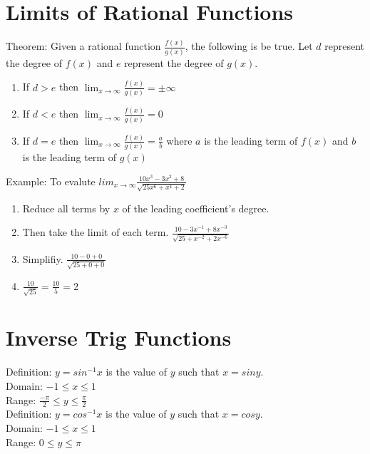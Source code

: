 \documentclass{article}
\begin{document}
\section{Limits of Rational Functions}
Theorem: Given a rational function $\frac{f(x)}{g(x)}$, the following is be true.
Let $d$ represent the degree of $f(x)$ and $e$ represent the degree of $g(x)$.\\
\begin{enumerate}
  \item If $d > e$ then $\lim_{x \to \infty}\frac{f(x)}{g(x)} = \pm \infty$
  \item If $d < e$ then $\lim_{x \to \infty}\frac{f(x)}{g(x)} = 0$
  \item If $d = e$ then $\lim_{x \to \infty}\frac{f(x)}{g(x)} = \frac{a}{b}$ where $a$ is the leading term of $f(x)$ and $b$ is the leading term of $g(x)$
\end{enumerate}

Example: To evalute $lim_{x \to \infty}\frac{10x^3 - 3x^2 + 8}{\sqrt{25x^6 + x^4 + 2}}$
\begin{enumerate}
  \item {Reduce all terms by $x$ of the leading coefficient's degree.}
  \item {Then take the limit of each term. $\frac{10 - 3x^{-1} + 8x^{-3}}{\sqrt{25 + x^{-2} + 2x^{-6}}}$}
  \item {Simplifiy. $\frac{10 - 0 + 0}{\sqrt{25 + 0 + 0}}$}
  \item {$\frac{10}{\sqrt{25}} = \frac{10}{5} = 2$}
\end{enumerate}

\section{Inverse Trig Functions}
\noindent
Definition: $y = sin^{-1}x$ is the value of $y$ such that $x = siny$.\\
\indent
Domain: $-1 \leq x \leq 1$\\
\indent
Range: $\frac{-\pi}{2} \leq y \leq \frac{\pi}{2}$\\

\noindent
Definition: $y = cos^{-1}x$ is the value of $y$ such that $x = cosy$.\\
\indent
Domain: $-1 \leq x \leq 1$\\
\indent
Range: $0 \leq y \leq \pi$\\
\end{document}
